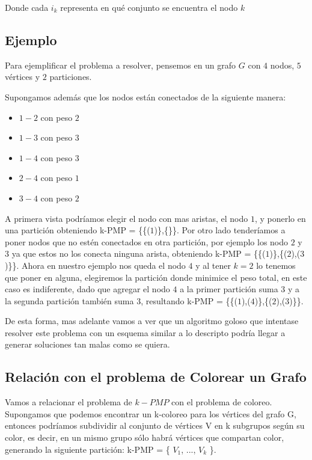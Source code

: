 Donde cada $i_k$ representa en qué conjunto se encuentra el nodo $k$

\subsection{Ejemplo}

Para ejemplificar el problema a resolver, pensemos en un grafo $G$ con $4$ nodos, $5$ vértices y $2$ particiones.

Supongamos además que los nodos están conectados de la siguiente manera:

\begin{itemize}

	\item $1-2$ con peso $2$
	\item $1-3$ con peso $3$
	\item $1-4$ con peso $3$
	\item $2-4$ con peso $1$
	\item $3-4$ con peso $2$

\end{itemize}

A primera vista podríamos elegir el nodo con mas aristas, el nodo $1$, y ponerlo en una partición obteniendo k-PMP = \{\{($1$)\},\{\}\}. Por otro lado tenderíamos a poner nodos que no estén conectados en otra partición, por ejemplo los nodo $2$ y $3$ ya que estos no los conecta ninguna arista, obteniendo k-PMP = \{\{($1$)\},\{($2$),($3$)\}\}. Ahora en nuestro ejemplo nos queda el nodo $4$ y al tener $k = 2$ lo tenemos que poner en alguna, elegiremos la partición donde minimice el peso total, en este caso es indiferente, dado que agregar el nodo $4$ a la primer partición suma $3$ y a la segunda partición también suma $3$, resultando k-PMP = \{\{($1$),($4$)\},\{($2$),($3$)\}\}. 

De esta forma, mas adelante vamos a ver que un algoritmo goloso que intentase resolver este problema con un esquema similar a lo descripto podría llegar a generar soluciones tan malas como se quiera.

\subsection{Relación con el problema de Colorear un Grafo}

Vamos a relacionar el problema de $k-PMP$ con el problema de coloreo. Supongamos que podemos encontrar un k-coloreo para los vértices del grafo G, entonces podríamos subdividir al conjunto de vértices V en k subgrupos según su color, es decir, en un mismo grupo sólo habrá vértices que compartan color, generando la siguiente partición: k-PMP = \{ $V_1$, ..., $V_k$ \}. 

